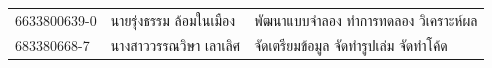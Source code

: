 \thispagestyle{empty}

\vspace*{6.0cm}

\begin{center}
{\large
\begin{tabular}{lll}
6633800639-0 & นายรุ่งธรรม ล้อมในเมือง & พัฒนาแบบจำลอง ทำการทดลอง วิเคราะห์ผล \\[0.8em]
683380668-7 & นางสาววรรณวิษา เลาเลิศ & จัดเตรียมข้อมูล จัดทำรูปเล่ม จัดทำโค้ด \\
\end{tabular}
}
\end{center}

\vfill
\clearpage
